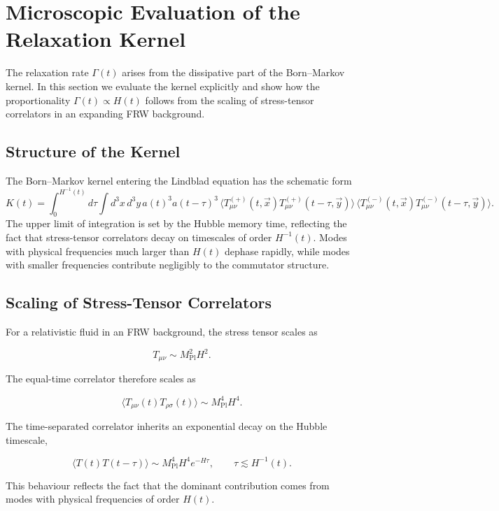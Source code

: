 \documentclass[11pt,a4paper]{article}
\newcommand{\Tplus}{T^{(+)}_{\mu\nu}}
\newcommand{\Tminus}{T^{(-)}_{\mu\nu}}
\begin{document}
\section{Microscopic Evaluation of the Relaxation Kernel}

The relaxation rate \(\Gamma(t)\) arises from the dissipative part of the
Born--Markov kernel. In this section we evaluate the kernel explicitly and show
how the proportionality \(\Gamma(t) \propto H(t)\) follows from the scaling of
stress-tensor correlators in an expanding FRW background.

\subsection{Structure of the Kernel}

The Born--Markov kernel entering the Lindblad equation has the schematic form
\begin{equation}
K(t)
    = \int_{0}^{H^{-1}(t)}
      d\tau
      \int d^{3}x\, d^{3}y\,
      a(t)^{3} a(t-\tau)^{3}\,
      \langle \Tplus(t,\vec{x}) \Tplus(t-\tau,\vec{y}) \rangle\,
      \langle \Tminus(t,\vec{x}) \Tminus(t-\tau,\vec{y}) \rangle.
\end{equation}
The upper limit of integration is set by the Hubble memory time, reflecting the
fact that stress-tensor correlators decay on timescales of order \(H^{-1}(t)\).
Modes with physical frequencies much larger than \(H(t)\) dephase rapidly, while
modes with smaller frequencies contribute negligibly to the commutator
structure.

\subsection{Scaling of Stress-Tensor Correlators}

For a relativistic fluid in an FRW background, the stress tensor scales as


\[
T_{\mu\nu} \sim M_{\mathrm{Pl}}^{2} H^{2}.
\]


The equal-time correlator therefore scales as


\[
\langle T_{\mu\nu}(t) T_{\rho\sigma}(t) \rangle
    \sim M_{\mathrm{Pl}}^{4} H^{4}.
\]


The time-separated correlator inherits an exponential decay on the Hubble
timescale,


\[
\langle T(t) T(t-\tau) \rangle
    \sim M_{\mathrm{Pl}}^{4} H^{4} e^{-H\tau},
\qquad
\tau \lesssim H^{-1}(t).
\]


This behaviour reflects the fact that the dominant contribution comes from modes
with physical frequencies of order \(H(t)\).
\end{document}
